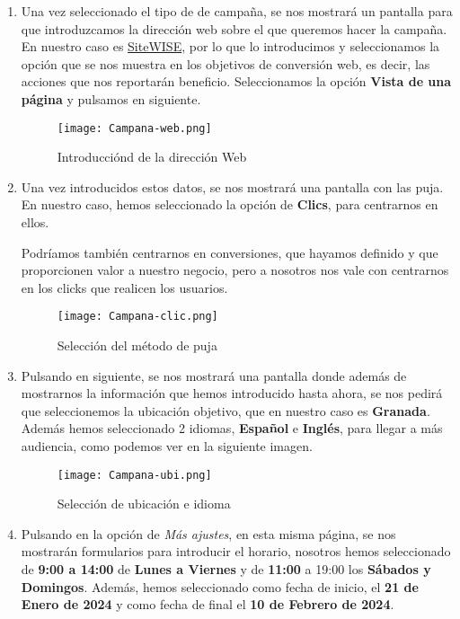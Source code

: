 \begin{enumerate}
    \item Una vez seleccionado el tipo de de campaña, se nos mostrará un pantalla para que  introduzcamos la dirección web sobre el que queremos hacer la campaña. En nuestro caso es \href{https://sites.google.com/view/sitewise/inicio}{SiteWISE}, por lo que lo introducimos y seleccionamos la opción que se nos muestra en los objetivos de conversión web, es decir, las acciones que nos reportarán beneficio. Seleccionamos la opción \textbf{Vista de una página} y pulsamos en siguiente.

    \begin{figure}[H]
        \centering
        \texttt{[image: Campana-web.png]}
        \caption{Introducciónd de la dirección Web}
    \end{figure}

    \item Una vez introducidos estos datos, se nos mostrará una pantalla con las puja. En nuestro caso, hemos seleccionado la opción de \textbf{Clics}, para centrarnos en ellos.

    Podríamos también centrarnos en conversiones, que hayamos definido y que proporcionen valor a nuestro negocio, pero a nosotros nos vale con centrarnos en los clicks que realicen los usuarios.


     \begin{figure}[H]
        \centering
        \texttt{[image: Campana-clic.png]}
        \caption{Selección del método de puja}
    \end{figure}

     \item Pulsando en siguiente, se nos mostrará una pantalla donde además de mostrarnos la información que hemos introducido hasta ahora, se nos pedirá que seleccionemos la ubicación objetivo, que en nuestro caso es \textbf{Granada}. Además hemos seleccionado 2 idiomas, \textbf{Español} e \textbf{Inglés}, para llegar a más audiencia, como podemos ver en la siguiente imagen.

    \begin{figure}[H]
        \centering
        \texttt{[image: Campana-ubi.png]}
        \caption{Selección de ubicación e idioma}
    \end{figure}

    \item Pulsando en la opción de \textit{Más ajustes}, en esta misma página, se nos mostrarán formularios para introducir el horario, nosotros hemos seleccionado de \textbf{9:00 a 14:00} de \textbf{Lunes a Viernes} y de \textbf{11:00} a {19:00} los \textbf{Sábados y Domingos}. Además, hemos seleccionado como fecha de inicio, el \textbf{21 de Enero de 2024} y como fecha de final el \textbf{10 de Febrero de 2024}.


\end{enumerate}

